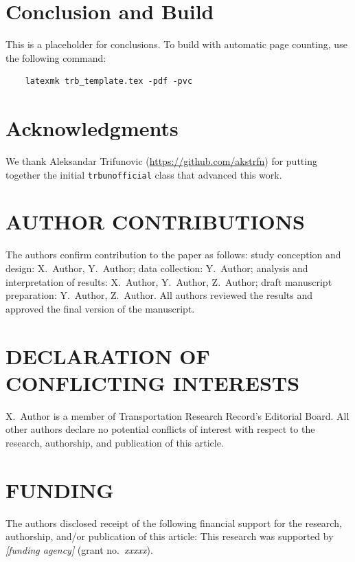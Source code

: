 \documentclass[numbered]{trbunofficial}
\begin{document}
\section{Conclusion and Build}\label{sec:build}
This is a placeholder for conclusions.  To build with automatic page counting, use the following command:
\begin{verbatim}
    latexmk trb_template.tex -pdf -pvc
\end{verbatim}

\section{Acknowledgments}
We thank Aleksandar Trifunovic (\url{https://github.com/akstrfn}) for putting together the initial \verb|trbunofficial| class that advanced this work.

\section*{AUTHOR CONTRIBUTIONS}
The authors confirm contribution to the paper as follows: 
study conception and design: X.~Author, Y.~Author; 
data collection: Y.~Author; 
analysis and interpretation of results: X.~Author, Y.~Author, Z.~Author; 
draft manuscript preparation: Y.~Author, Z.~Author. 
All authors reviewed the results and approved the final version of the manuscript.

\section*{DECLARATION OF CONFLICTING INTERESTS}
X.~Author is a member of Transportation Research Record’s Editorial Board.  All other authors declare no potential conflicts of interest with respect to the research, authorship, and publication of this article.



\section*{FUNDING}
The authors disclosed receipt of the following financial support 
for the research, authorship, and/or publication of this article: 
This research was supported by \emph{[funding agency]} (grant no.~\emph{xxxxx}).



\newpage


\end{document}
